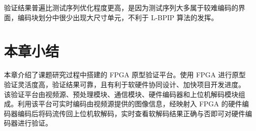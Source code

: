 验证结果普遍比测试序列优化程度更高，是因为测试序列大多属于较难编码的界面，编码块划分中很少出现大尺寸单元，不利于 L-BPIP 算法的发挥。

\section{本章小结}
本章介绍了课题研究过程中搭建的 FPGA 原型验证平台。使用 FPGA 进行原型验证灵活度高，验证结果可靠，且有利于软硬件协同设计、加快项目开发进度。
该验证平台由视频源、预处理模块、通信模块、硬件编码器和上位机解码模块组成。利用该平台可实时编码由视频源提供的图像信息，经映射入 FPGA 的硬件编码器编码后将码流传回上位机软解码，实时查看软解码结果正确与否即可对硬件编码器进行验证。